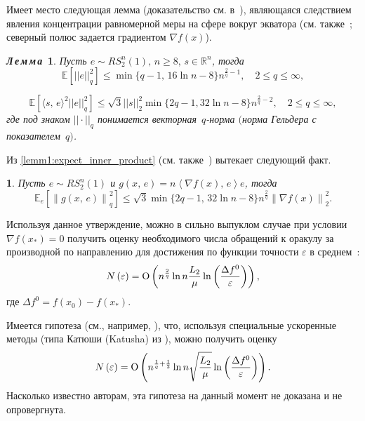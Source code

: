 \documentclass[11pt]{article}
\newtheorem{lemma}{\hspace{\parindent}\sl{Л\,е\,м\,м\,а\,}}
\newcommand{\E}{\mathbb{E}}
\newcommand{\RR}{\mathbb{R}}
\newtheorem{CoroNoNum}{\hspace{\parindent}{\sl У~т~в~е~р~ж~д~е~н~и~е~}}
\begin{document}
	
	Имеет место следующая лемма (доказательство см. в~\cite{GorVorGas_lemma1}), являющаяся следствием явления 
	концентрации равномерной меры на сфере вокруг экватора (см. также~\cite{BD}; северный полюс задается градиентом $\nabla f\left( x \right)$).
	\begin{lemma}
		Пусть $e \sim RS_2^n(1),\, n \geqslant8,\, s\in\RR^n$, тогда
		\begin{equation}\label{lemm1:expect_q_norm}
        \E[||e||_q^2] \leqslant \min\{q-1,\,16\ln n - 8\}n^{\frac{2}{q}-1},\quad 2\leqslant q \leqslant \infty,
    \end{equation}
    
    \begin{equation}\label{lemm1:expect_inner_product}
        \E[\langle s,\, e\rangle^2||e||_q^2] \leqslant \sqrt{3}||s||_2^2\min\{2q-1,32\ln n -8\}n^{\frac{2}{q}-2},\quad 2\leqslant q \leqslant \infty,
    \end{equation}
    где под знаком $||\cdot||_q$ понимается векторная~$q$-норма $($норма Гельдера с показателем~$q)$.
	\end{lemma}
	
	Из \eqref{lemm1:expect_inner_product} (см. также~\cite{GLUF}) вытекает следующий факт.
	
	\begin{CoroNoNum}
		Пусть $e \sim RS_2^n \left( 1 \right)$ и $g\left( {x, \, e} \right)=n\left\langle {\nabla f\left( x \right), \, e} \right\rangle e$, тогда
		\[
		\E_e \left[ {\left\| {g\left( {x, \, e} \right)} \right\|_q^2 } \right]\leqslant\sqrt{3} {\min\{2q-1,\,32\ln n -     8\} n^{\frac{2}{q}}\left\| {\nabla f\left( x \right)} \right\|_2^2 
		} .
				\]
	\end{CoroNoNum}
	
	
	Используя данное утверждение, можно в сильно выпуклом случае при условии $\nabla 
	f\left( {x_\ast } \right)=0$ получить оценку необходимого числа обращений к оракулу за производной по направлению для достижения по функции точности $\varepsilon$ в среднем~\cite{about-non-triviality}:
	\[
	N\left( \varepsilon \right)= {{\rm O}}\left( {n^{\frac{2}{q}} \ln n  \frac{L_2 
		}{\mu }\ln \left( {\frac{\Delta f^0}{\varepsilon }} \right)} \right),
	\]
	где $\Delta f^0 = f(x_0) - f(x_{*})$.
	
	Имеется гипотеза (см., например, \cite{stochastic-gradients-inexact-oracle}), 
	что, используя специальные ускоренные методы (типа Катюши (Katusha) из 
	\cite{Allen-Zhu-Katusha}), можно получить оценку
	\[
	N\left( \varepsilon \right)={\rm O}\left( {n^{\frac{1}{q}+\frac{1}{2}}\ln n\sqrt 
		{\frac{L_2 }{\mu }} \ln \left( {\frac{\Delta f^0}{\varepsilon }} \right)} 
	\right).
	\]
	Насколько известно авторам, эта гипотеза на данный момент не доказана и не опровергнута.
	
\end{document}
